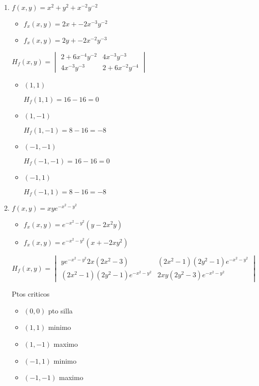 \documentclass[../practica_06.tex]{subfiles}
\begin{document}
    \begin{enumerate}
        \item $f(x,y) = x^2 + y^2 + x^{-2}y^{-2}$

            \begin{itemize}
                \item $f_x(x,y) = 2x + -2x^{-3}y^{-2}$
                \item $f_x(x,y) = 2y + -2x^{-2}y^{-3}$
            \end{itemize}

            $H_f(x,y) = \begin{vmatrix}
                2 + 6x^{-4}y^{-2} & 4x^{-3}y^{-3} \\
                4x^{-3}y^{-3} & 2 + 6x^{-2}y^{-4}
            \end{vmatrix}$

            \begin{itemize}
                \item $(1,1)$
                
                    $H_f(1,1) = 16 - 16 = 0  $
                    
                \item $(1,-1)$

                    $H_f(1,-1) = 8 - 16 = -8 $

                \item $(-1,-1)$

                    $H_f(-1,-1) = 16 - 16 = 0 $

                \item $(-1,1)$

                    $H_f(-1,1) = 8 - 16 = -8 $

            \end{itemize}

        \item $f(x,y) = xye^{-x^2-y^2}$
        
            \begin{itemize}
                \item $f_x(x,y) = e^{-x^2-y^2}(y - 2x^2y)$
                \item $f_x(x,y) = e^{-x^2-y^2}(x + -2xy^2)$
            \end{itemize}

            $H_f(x,y) = \begin{vmatrix}
                ye^{-x^2-y^2}2x(2x^2-3) & (2x^2-1)(2y^2-1)e^{-x^2-y^2} \\
                (2x^2-1)(2y^2-1)e^{-x^2-y^2} & 2xy(2y^2-3)e^{-x^2-y^2}
            \end{vmatrix}$

            Ptos criticos \begin{itemize}
                \item $(0,0)$ pto silla
                \item $(1,1)$ minimo
                \item $(1,-1)$ maximo
                \item $(-1,1)$ minimo
                \item $(-1,-1)$ maximo
            \end{itemize}

    \end{enumerate}
\end{document}
